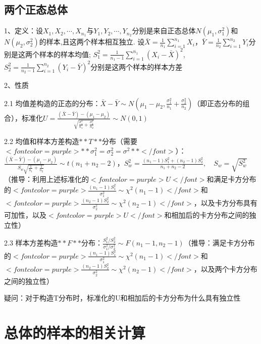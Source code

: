 \subsection{两个正态总体}

1、定义：设$ X_{1}, X_{2}, \cdots, X_{n_{1}} $与$ Y_{1}, Y_{2}, \cdots,Y_{n_{2}} $分别是来自正态总体$ N\left(\mu_{1}, \sigma_{1}^{2}\right) $和$ N\left(\mu_{2}, \sigma_{2}^{2}\right) $的样本,且这两个样本相互独立. 设$ \bar{X}=\frac{1}{n_{1}} \sum_{i=1}^{n_{1}} X_{i} $，$ \bar{Y}=\frac{1}{n_{2}} \sum_{i=1}^{n_{2}} Y_{i} $分别是这两个样本的样本均值; $ S_{1}^{2}=\frac{1}{n_{1}-1} \sum_{i=1}^{n_{1}}\left(X_{i}-\bar{X}\right)^{2} $, $ S_{2}^{2}=\frac{1}{n_{2}-1} \sum_{i=1}^{n_{2}}\left(Y_{i}-\bar{Y}\right)^{2} $分别是这两个样本的样本方差

2、性质

2.1 均值差构造的正态的分布：$ \bar{X}-\bar{Y} \sim N\left(\mu_{1}-\mu_{2}, \frac{\sigma_{1}^{2}}{n_{1}}+\frac{\sigma_{2}^{2}}{n_{2}}\right) $（即正态分布的组合），标准化$  U=\frac{(\bar{X}-\bar{Y})-\left(\mu_{1}-\mu_{2}\right)}{\sqrt{\frac{\sigma_{1}^{2}}{n_{1}}+\frac{\sigma_{2}^{2}}{n_{2}}}} \sim N(0,1) $

2.2 均值和样本方差构造$ **T** $分布（需要$ <font color=purple>**\sigma_{1}^{2}=\sigma_{2}^{2}=\sigma^{2}**</font> $）：$ \frac{(\bar{X}-\bar{Y})-\left(\mu_{1}-\mu_{2}\right)}{S_{w} \sqrt{\frac{1}{n_{1}}+\frac{1}{n_{2}}}} \sim t\left(n_{1}+n_{2}-2\right) $，$ S_{w}^{2}=\frac{\left(n_{1}-1\right) S_{1}^{2}+\left(n_{2}-1\right) S_{2}^{2}}{n_{1}+n_{2}-2}, \quad S_{w}=\sqrt{S_{w}^{2}} $（推导：利用上述标准化的$ <font color=purple>U</font> $和满足卡方分布的$ <font color=purple>\frac{(n_1-1) S_1^{2}}{\sigma_1^{2}} \sim \chi^{2}(n_1-1)</font> $和$ <font color=purple>\frac{(n_2-1) S_2^{2}}{\sigma_2^{2}} \sim \chi^{2}(n_2-1)</font> $，以及卡方分布具有可加性，以及$ <font color=purple>U</font> $和相加后的卡方分布之间的独立性）

2.3 样本方差构造$ **F** $分布：$ \frac{S_{1}^{2} / S_{2}^{2}}{\sigma_{1}^{2} / \sigma_{2}^{2}} \sim F\left(n_{1}-1, n_{2}-1\right) $（推导：满足卡方分布的$ <font color=purple>\frac{(n_1-1) S_1^{2}}{\sigma_1^{2}} \sim \chi^{2}(n_1-1)</font> $和$ <font color=purple>\frac{(n_2-1) S_2^{2}}{\sigma_2^{2}} \sim \chi^{2}(n_2-1)</font> $，以及两个卡方分布之间的独立性）

疑问：对于构造T分布时，标准化的U和相加后的卡方分布为什么具有独立性

\section{总体的样本的相关计算}



